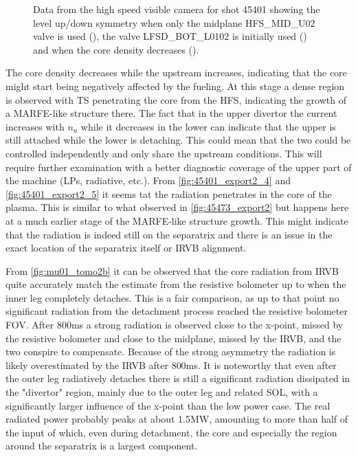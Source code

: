 \begin{figure}
\begin{subfigure}{0.054\linewidth}
    \end{subfigure}
    \caption{Data from the high speed visible camera for shot 45401 showing the level up/down symmetry when only the midplane HFS\_MID\_U02 valve is used (), the valve LFSD\_BOT\_L0102 is initially used () and when the core density decreases ().}
    \label{fig:mu01_tomo3}
\end{figure}
The core density decreases while the upstream increases, indicating that the core might start being negatively affected by the fueling. At this stage a dense region is observed with TS penetrating the core from the HFS, indicating the growth of a MARFE-like structure there. The fact that in the upper divertor the current increases with $n_u$ while it decreases in the lower can indicate that the upper is still attached while the lower is detaching. This could mean that the two could be controlled independently and only share the upstream conditions. This will require further examination with a better diagnostic coverage of the upper part of the machine (LPs, radiative, etc.). From \autoref{fig:45401_export2_4} and \ref{fig:45401_export2_5} it seems tat the radiation penetrates in the core of the plasma. This is similar to what observed in \autoref{fig:45473_export2} but happens here at a much earlier stage of the MARFE-like structure growth. This might indicate that the radiation is indeed still on the separatrix and there is an issue in the exact location of the separatrix itself or IRVB alignment.

From \autoref{fig:mu01_tomo2b} it can be observed that the core radiation from IRVB quite accurately match the estimate from the resistive bolometer up to when the inner leg completely detaches. This is a fair comparison, as up to that point no significant radiation from the detachment process reached the resistive bolometer FOV. After 800ms a strong radiation is observed close to the x-point, missed by the resistive bolometer and close to the midplane, missed by the IRVB, and the two conspire to compensate. Because of the strong asymmetry the radiation is likely overestimated by the IRVB after 800ms. It is noteworthy that even after the outer leg radiatively detaches there is still a significant radiation dissipated in the "divertor" region, mainly due to the outer leg and related SOL, with a significantly larger influence of the x-point than the low power case. The real radiated power probably peaks at about 1.5MW, amounting to more than half of the input of which, even during detachment, the core and especially the region around the separatrix is a largest component.

